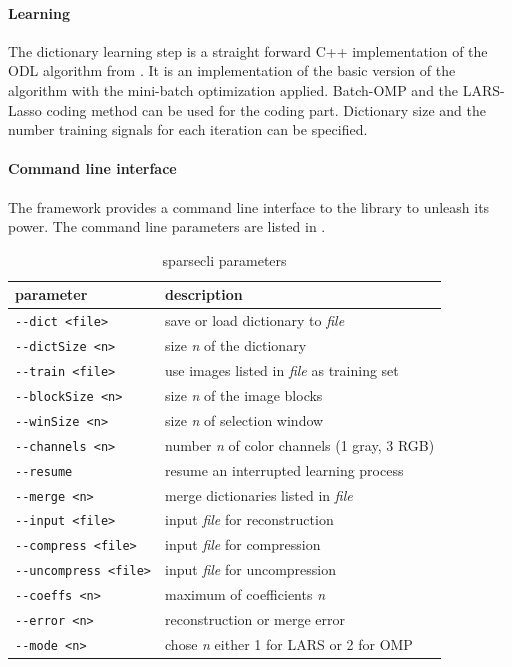 \paragraph{Learning}
The dictionary learning step is a straight forward C++ implementation of the
ODL algorithm from . It is an
implementation of the
basic version of the algorithm with the mini-batch optimization applied.
Batch-OMP and the LARS-Lasso coding method can be used for the coding part.
Dictionary size and the number training signals for each iteration can be
specified.

\paragraph{Command line interface}
The framework provides a command line interface to the library to unleash its
power. The command line parameters are listed in .
%
\begin{table}[h]
\centering
\begin{tabular}{ |l | l |}
\hline
parameter & description \\
\hline
\verb+--dict <file>+ & save or load dictionary to \emph{file}\\
\verb+--dictSize <n>+ & size \emph{n} of the dictionary  \\
\verb+--train <file>+ & use images listed in \emph{file} as training set\\
\verb+--blockSize <n>+ & size \emph{n} of the image blocks \\
\verb+--winSize <n>+ & size \emph{n} of selection window \\
\verb+--channels <n>+ &number \emph{n} of color channels (1 gray, 3 RGB) \\

\verb+--resume+ & resume an interrupted learning process \\
\verb+--merge <n>+ & merge dictionaries listed in \emph{file}  \\
\verb+--input <file>+ & input \emph{file} for reconstruction \\
\verb+--compress <file>+ & input \emph{file} for compression \\
\verb+--uncompress <file>+ & input \emph{file} for uncompression \\
\verb+--coeffs <n>+ & maximum of coefficients \emph{n} \\
\verb+--error <n>+ & reconstruction or merge error \\
\verb+--mode <n>+ & chose \emph{n} either 1 for LARS or 2 for OMP \\
\hline
\end{tabular}
\caption{sparsecli parameters}\label{tab:cli}
\end{table}

